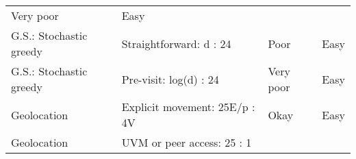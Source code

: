 \documentclass[10pt,oneside]{memoir}
\begin{document}
\begin{longtable}[]{@{}llll@{}}
\begin{minipage}[t]{0.13\columnwidth}
Very poor\strut
\end{minipage} & \begin{minipage}[t]{0.13\columnwidth}\raggedright
Easy\strut
\end{minipage}\tabularnewline
\begin{minipage}[t]{0.28\columnwidth}\raggedright
G.S.: Stochastic greedy\strut
\end{minipage} & \begin{minipage}[t]{0.35\columnwidth}\raggedright
Straightforward: d : 24\strut
\end{minipage} & \begin{minipage}[t]{0.13\columnwidth}\raggedright
Poor\strut
\end{minipage} & \begin{minipage}[t]{0.13\columnwidth}\raggedright
Easy\strut
\end{minipage}\tabularnewline
\begin{minipage}[t]{0.28\columnwidth}\raggedright
G.S.: Stochastic greedy\strut
\end{minipage} & \begin{minipage}[t]{0.35\columnwidth}\raggedright
Pre-visit: log(d) : 24\strut
\end{minipage} & \begin{minipage}[t]{0.13\columnwidth}\raggedright
Very poor\strut
\end{minipage} & \begin{minipage}[t]{0.13\columnwidth}\raggedright
Easy\strut
\end{minipage}\tabularnewline
\begin{minipage}[t]{0.28\columnwidth}\raggedright
Geolocation\strut
\end{minipage} & \begin{minipage}[t]{0.35\columnwidth}\raggedright
Explicit movement: 25E/p : 4V\strut
\end{minipage} & \begin{minipage}[t]{0.13\columnwidth}\raggedright
Okay\strut
\end{minipage} & \begin{minipage}[t]{0.13\columnwidth}\raggedright
Easy\strut
\end{minipage}\tabularnewline
\begin{minipage}[t]{0.28\columnwidth}\raggedright
Geolocation\strut
\end{minipage} & \begin{minipage}[t]{0.35\columnwidth}\raggedright
UVM or peer access: 25 : 1\strut
\end{minipage} & \begin{minipage}[t]{0.13\columnwidth}\raggedright

\end{minipage}
\end{longtable}
\end{document}
